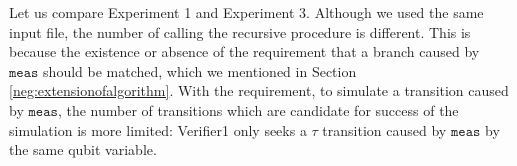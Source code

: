 Let us compare Experiment 1 and Experiment 3.
Although we used the same input file, the number of calling the 
recursive procedure is different. This is because the existence or
absence of the requirement that a branch caused by $\mathtt{meas}$
should be matched, which we mentioned in Section 
\ref{neg:extensionofalgorithm}. With
the requirement, to simulate a
transition caused by $\mathtt{meas}$, the number of transitions which
are candidate for success of the simulation is more limited:
Verifier1 only seeks a $\tau$ transition caused by $\mathtt{meas}$ by the
same qubit variable.



